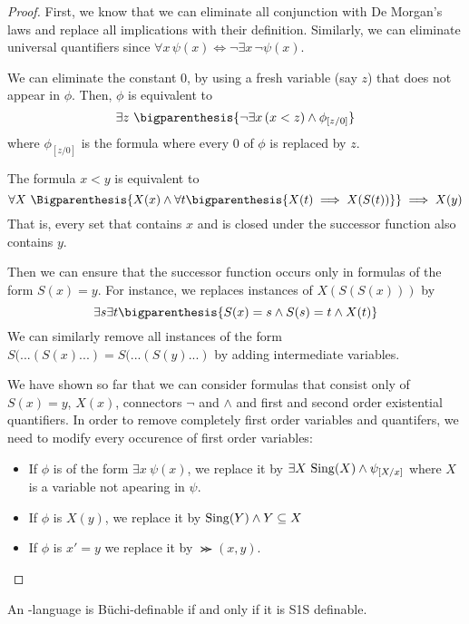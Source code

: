 \begin{proof}
    First, we know that we can eliminate all conjunction with De Morgan's
    laws and replace all implications with their definition. Similarly, we can eliminate universal quantifiers
    since $\forall x\, \psi(x) \iff \neg \exists x\, \neg \psi(x)$.

    We can eliminate the constant $0$, by using a fresh variable (say $z$)
    that does not appear in $\phi$. Then, $\phi$ is equivalent to
    \[
        \exists z~ \bigparenthesis{\neg\exists x\, (x < z) \wedge \phi_{[z/0]}}
    \]
    where $\phi_{[z/0]}$ is the formula where every 0 of $\phi$ is replaced by $z$.

    The formula $x < y$ is equivalent to \[
        \forall X~ \Bigparenthesis{
            X(x) \wedge \forall t \bigparenthesis{X(t) \implies X(S(t))}
        } \implies X(y)
    \]
    That is, every set that contains $x$ and is closed under the successor
    function also contains $y$.

    Then we can ensure that the successor function occurs only
    in formulas of the form $S(x) = y$. For instance,
    we replaces instances of $X(S(S(x)))$ by \[
        \exists s \exists t \bigparenthesis{
            S(x) = s \wedge S(s) = t \wedge X(t)
        }
    \]
    We can similarly remove all instances of the form $S(...(S(x)...) = S(...(S(y)...)$
    by adding intermediate variables.

    We have shown so far that we can consider formulas
    that consist only of $S(x) = y$, $X(x)$, connectors $\neg$ and $\wedge$
    and first and second order existential quantifiers.
    In order to remove completely first order variables and quantifers,
    we need to modify every occurence of first order variables:
    \begin{itemize}
        \item If $\phi$ is of the form $\exists x~ \psi(x)$, we replace it by
            $\exists X ~ \mathrm{Sing}(X) \wedge \psi_{[X/x]}$ where $X$ is a variable not apearing
            in $\psi$.
        \item If $\phi$ is $X(y)$, we replace it by $\mathrm{Sing}(Y) \wedge Y \subseteq X$
        \item If $\phi$ is $x' = y$ we replace it by $\Succ(x, y)$.
    \end{itemize}
\end{proof}

\begin{theorem}
    An \w-language is Büchi-definable if and only if
    it is S1S definable.
\end{theorem}

